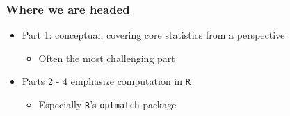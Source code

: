 \documentclass[table, xcolor = {dvipsnames}, 9pt]{beamer}
\theoremstyle{plain}
\newcommand{\mh}[1]{{\color{magenta}{#1}}}
\begin{document}
\begin{frame}[t]
\frametitle{Where we are headed}
\vfill
\begin{itemize} \vfill
\item Part 1: conceptual, covering core statistics from a \mh{randomization- (design-) based} perspective \vfill
\begin{itemize} \vfill
\item[$\star$] Often the most challenging part \vfill
\end{itemize} \vfill
\item Parts 2 - 4 emphasize computation in \texttt{R} \vfill
\begin{itemize} \vfill
\item Especially \texttt{R}'s \texttt{optmatch} package \vfill
\end{itemize} \vfill
\end{itemize} \vfill
\vfill
\end{frame}
\end{document}
